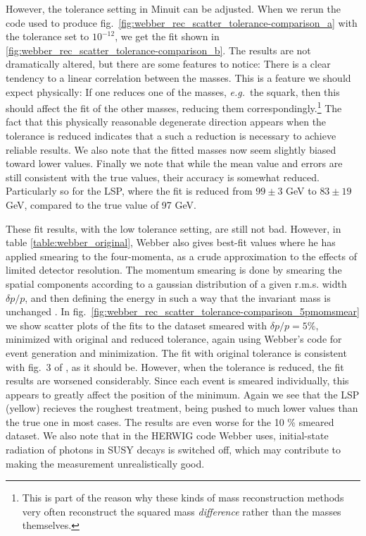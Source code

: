 \documentclass[twoside,english]{uiofysmaster}
\begin{document}
However, the tolerance setting in {Minuit} can be adjusted. When we rerun the code used to produce fig.\ \ref{fig:webber_rec_scatter_tolerance-comparison_a} with the tolerance set to $10^{-12}$, we get the fit shown in \ref{fig:webber_rec_scatter_tolerance-comparison_b}. The results are not dramatically altered, but there are some features to notice: There is a clear tendency to a linear correlation between the masses. This is a feature we should expect physically: If one reduces one of the masses, {\it e.g.}\ the squark, then this should affect the fit of the other masses, reducing them correspondingly.\footnote{This is part of the reason why these kinds of mass reconstruction methods very often reconstruct the squared mass {\it difference} rather than the masses themselves.} The fact that this physically reasonable degenerate direction appears when the tolerance is reduced indicates that a such a reduction is necessary to achieve reliable results. We also note that the fitted masses now seem slightly biased toward lower values. Finally we note that while the mean value and errors are still consistent with the true values, their accuracy is somewhat reduced. Particularly so for the LSP, where the fit is reduced from $99 \pm 3$ GeV to $83 \pm 19$ GeV, compared to the true value of 97 GeV.

These fit results, with the low tolerance setting, are still not bad. However, in table \ref{table:webber_original}, Webber also gives best-fit values where he has applied smearing to the four-momenta, as a crude approximation to the effects of limited detector resolution. The momentum smearing is done by smearing the spatial components according to a gaussian distribution of a given r.m.s. width $\delta p/p$, and then defining the energy in such a way that the invariant mass is unchanged \cite{Webber:epost}. In fig.\ \ref{fig:webber_rec_scatter_tolerance-comparison_5pmomsmear} we show scatter plots of the fits to the dataset smeared with $\delta p/p = 5 \%$, minimized with original and reduced tolerance, again using Webber's code for event generation and minimization. The fit with original tolerance is consistent with fig.\ 3 of \cite{Webber:2009vm}, as it should be. However, when the tolerance is reduced, the fit results are worsened considerably. Since each event is smeared individually, this appears to greatly affect the position of the minimum. Again we see that the LSP (yellow) recieves the roughest treatment, being pushed to much lower values than the true one in most cases. The results are even worse for the 10 \% smeared dataset. We also note that in the HERWIG code Webber uses, initial-state radiation of photons in SUSY decays is switched off, which may contribute to making the measurement unrealistically good.
\end{document}
